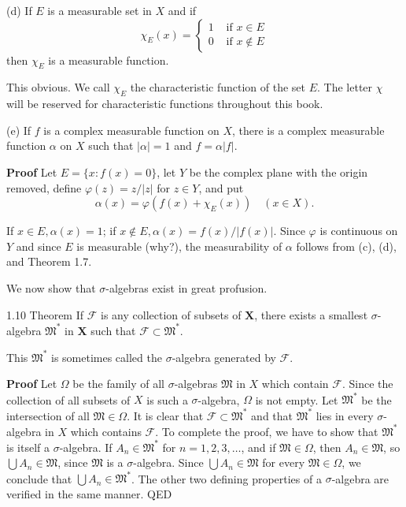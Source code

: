 \documentclass[11pt]{article}
\begin{document}
(d) If \(E\) is a measurable set in \(X\) and if
\[
\chi_E(x)= \begin{cases}1 & \text { if } x \in E \\ 0 & \text { if } x \notin E\end{cases}
\]
then \(\chi_E\) is a measurable function.

This obvious. We call \(\chi _{E}\) the characteristic function of the set \(E\). The letter \(\chi\) will be reserved for characteristic functions throughout this book.

(e) If \(f\) is a complex measurable function on \(X\), there is a complex measurable function \(\alpha\) on \(X\) such that \(\vert \alpha \vert = 1\) and \(f = \alpha \vert f \vert\).

\medskip
\textbf{Proof} Let \(E=\{x: f(x)=0\}\), let \(Y\) be the complex plane with the origin removed, define \(\varphi(z)=z /|z|\) for \(z \in Y\), and put
\[
\alpha(x)=\varphi\left(f(x)+\chi_E(x)\right) \quad(x \in X) .
\]

If \(x \in E, \alpha(x)=1\); if \(x \notin E, \alpha(x)=f(x) /|f(x)|\). Since \(\varphi\) is continuous on \(Y\) and since \(E\) is measurable (why?), the measurability of \(\alpha\) follows from (c), (d), and Theorem 1.7.

\bigskip
We now show that \(\sigma\)-algebras exist in great profusion.

\medskip
\label{orgeb1022f}
1.10 Theorem If \(\mathscr{F}\) is any collection of subsets of \(\boldsymbol{X}\), there exists a smallest \(\sigma\)-algebra \(\mathfrak{M}^*\) in \(\boldsymbol{X}\) such that \(\mathscr{F} \subset \mathfrak{M}^*\).

This \(\mathfrak{M}^*\) is sometimes called the \(\sigma\)-algebra generated by \(\mathscr{F}\).

\medskip
\textbf{Proof} Let \(\Omega\) be the family of all \(\sigma\)-algebras \(\mathfrak{M}\) in \(X\) which contain \(\mathscr{F}\). Since the collection of all subsets of \(X\) is such a \(\sigma\)-algebra, \(\Omega\) is not empty. Let \(\mathfrak{M}^*\) be the intersection of all \(\mathfrak{M} \in \Omega\). It is clear that \(\mathscr{F} \subset \mathfrak{M}^*\) and that \(\mathfrak{M}^*\) lies in every \(\sigma\)-algebra in \(X\) which contains \(\mathscr{F}\). To complete the proof, we have to show that \(\mathfrak{M}^*\) is itself a \(\sigma\)-algebra.
  If \(A_n \in \mathfrak{M}^*\) for \(n=1,2,3, \ldots\), and if \(\mathfrak{M} \in \Omega\), then \(A_n \in \mathfrak{M}\), so \(\bigcup A_n \in \mathfrak{M}\), since \(\mathfrak{M}\) is a \(\sigma\)-algebra. Since \(\bigcup A_n \in \mathfrak{M}\) for every \(\mathfrak{M} \in \Omega\), we conclude that \(\bigcup A_n \in \mathfrak{M}^*\). The other two defining properties of a \(\sigma\)-algebra are verified in the same manner.
QED
\end{document}
